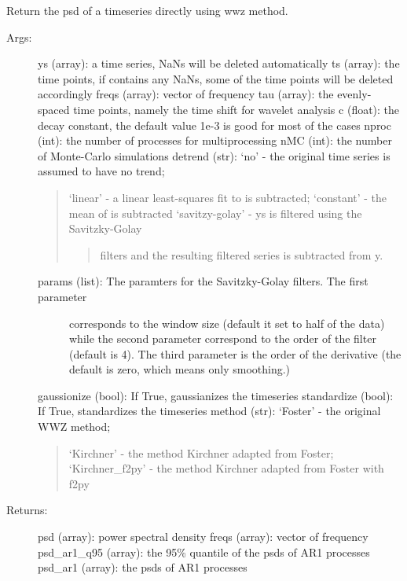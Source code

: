 \documentclass[letterpaper,10pt,english]{sphinxmanual}
\begin{document}
\begin{fulllineitems}
\label{\detokenize{Spectral:pyleoclim.Spectral.wwz_psd}}
Return the psd of a timeseries directly using wwz method.
\begin{description}
\item[{Args:}] \leavevmode
ys (array): a time series, NaNs will be deleted automatically
ts (array): the time points, if  contains any NaNs, some of the time points will be deleted accordingly
freqs (array): vector of frequency
tau (array): the evenly-spaced time points, namely the time shift for wavelet analysis
c (float): the decay constant, the default value 1e-3 is good for most of the cases
nproc (int): the number of processes for multiprocessing
nMC (int): the number of Monte-Carlo simulations
detrend (str): ‘no’ - the original time series is assumed to have no trend;
\begin{quote}

‘linear’ - a linear least-squares fit to  is subtracted;
‘constant’ - the mean of  is subtracted
‘savitzy-golay’ - ys is filtered using the Savitzky-Golay
\begin{quote}

filters and the resulting filtered series is subtracted from y.
\end{quote}
\end{quote}
\begin{description}
\item[{params (list): The paramters for the Savitzky-Golay filters. The first parameter}] \leavevmode
corresponds to the window size (default it set to half of the data)
while the second parameter correspond to the order of the filter
(default is 4). The third parameter is the order of the derivative
(the default is zero, which means only smoothing.)

\end{description}

gaussionize (bool): If True, gaussianizes the timeseries
standardize (bool): If True, standardizes the timeseries
method (str): ‘Foster’ - the original WWZ method;
\begin{quote}

‘Kirchner’ - the method Kirchner adapted from Foster;
‘Kirchner\_f2py’ - the method Kirchner adapted from Foster with f2py
\end{quote}

\item[{Returns:}] \leavevmode
psd (array): power spectral density
freqs (array): vector of frequency
psd\_ar1\_q95 (array): the 95\% quantile of the psds of AR1 processes
psd\_ar1 (array): the psds of AR1 processes

\end{description}

\end{fulllineitems}
\end{document}
